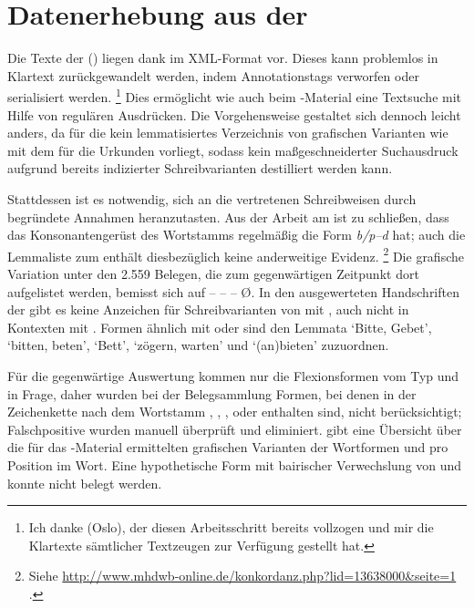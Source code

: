 
\section{Datenerhebung aus der }

Die Texte der  (\KC) liegen dank 
\autocite{kcdigital} im XML-Format vor. Dieses kann problemlos in Klartext
zurückgewandelt werden, indem Annotationstags verworfen oder
serialisiert werden.%
%
	\footnote{Ich danke  (Oslo), der diesen
	Arbeitsschritt bereits vollzogen und mir die Klartexte sämtlicher
	Textzeugen zur Verfügung gestellt hat.}
%
Dies ermöglicht wie auch beim \CAO{}-Material eine Textsuche mit Hilfe von
regulären Ausdrücken. Die Vorgehensweise gestaltet sich dennoch leicht anders,
da für die \KC{} kein lemmatisiertes Verzeichnis von grafischen Varianten wie
mit dem \WMU{} für die Urkunden vorliegt, sodass kein maßgeschneiderter
Suchausdruck aufgrund bereits indizierter Schreibvarianten destilliert werden
kann.

Stattdessen ist es notwendig, sich an die vertretenen Schreibweisen durch
begründete Annahmen heranzutasten. Aus der Arbeit am \CAO{} ist zu schließen,
dass das Konsonantengerüst des Wortstamms regelmäßig die Form \textit{b/p--d}
hat; auch die Lemmaliste zum  \autocite[s.\,v.~]{mwb1} enthält diesbezüglich keine
anderweitige Evidenz.%
%
	\footnote{Siehe
		\url{http://www.mhdwb-online.de/konkordanz.php?lid=13638000&seite=1}%
		.}
%
Die grafische Variation unter den 2.559 Belegen, die zum gegenwärtigen
Zeitpunkt dort aufgelistet werden, bemisst sich auf  --  --  --  Ø. In den ausgewerteten Handschriften der \KC{} gibt
es keine Anzeichen für Schreibvarianten von  mit , auch
nicht in Kontexten mit . Formen ähnlich  mit 
oder  sind den Lemmata  `Bitte, Gebet', 
`bitten, beten',  `Bett',  `zögern, warten' und
 `(an)bieten' zuzuordnen.

Für die gegenwärtige Auswertung kommen nur die Flexionsformen vom Typ 
und  in Frage, daher wurden bei der Belegsammlung Formen, bei denen
in der Zeichenkette nach dem Wortstamm , , , 
oder  enthalten sind, nicht berücksichtigt; Falschpositive wurden
manuell überprüft und eliminiert.  gibt eine Übersicht
über die für das \KC{}-Material ermittelten grafischen Varianten der Wortformen
 und  pro Position im Wort. Eine hypothetische Form
 mit bairischer Verwechslung von 
und  \autocite[153]{paul2007} konnte nicht belegt werden.

